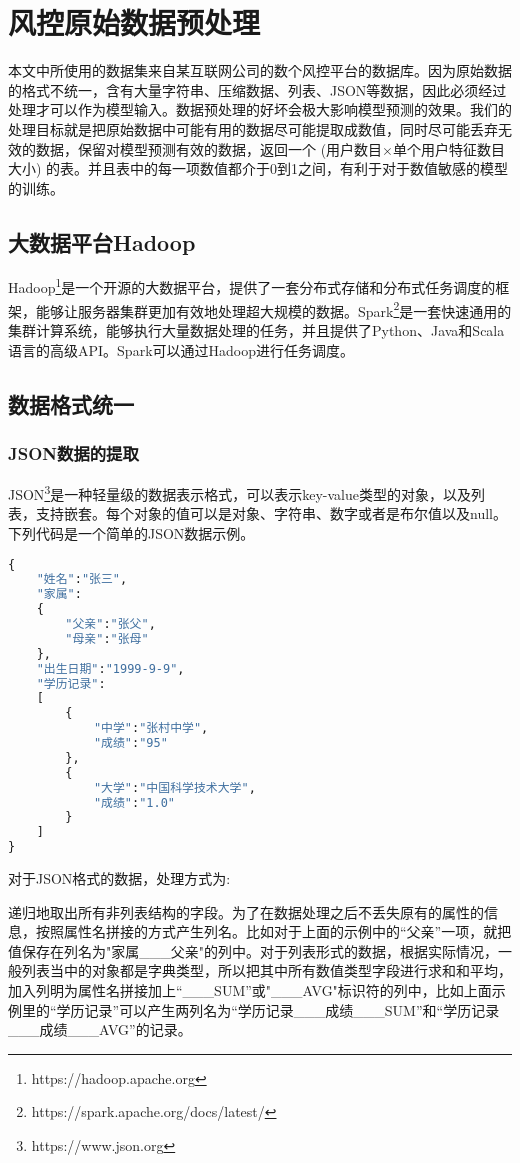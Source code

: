 \chapter{风控原始数据预处理}
本文中所使用的数据集来自某互联网公司的数个风控平台的数据库。因为原始数据的格式不统一，含有大量字符串、压缩数据、列表、JSON等数据，因此必须经过处理才可以作为模型输入。数据预处理的好坏会极大影响模型预测的效果\cite{kotsiantis2006data}。我们的处理目标就是把原始数据中可能有用的数据尽可能提取成数值，同时尽可能丢弃无效的数据，保留对模型预测有效的数据，返回一个 (用户数目$\times$单个用户特征数目大小) 的表。并且表中的每一项数值都介于0到1之间，有利于对于数值敏感的模型的训练。
\section{大数据平台Hadoop}
Hadoop\footnote{https://hadoop.apache.org}是一个开源的大数据平台，提供了一套分布式存储和分布式任务调度的框架，能够让服务器集群更加有效地处理超大规模的数据。Spark\footnote{https://spark.apache.org/docs/latest/}是一套快速通用的集群计算系统，能够执行大量数据处理的任务，并且提供了Python、Java和Scala语言的高级API。Spark可以通过Hadoop进行任务调度。
\section{数据格式统一}
\subsection{JSON数据的提取}
JSON\footnote{https://www.json.org}是一种轻量级的数据表示格式，可以表示key-value类型的对象，以及列表，支持嵌套。每个对象的值可以是对象、字符串、数字或者是布尔值以及null。下列代码是一个简单的JSON数据示例。
\begin{lstlisting}[language=PYTHON, caption={JSON示例}, label={JSON示例}]
{
	"姓名":"张三",
	"家属": 
	{
		"父亲":"张父",
		"母亲":"张母"
	},
	"出生日期":"1999-9-9",
	"学历记录":
	[
		{
			"中学":"张村中学",
			"成绩":"95"
		},
		{
			"大学":"中国科学技术大学",
			"成绩":"1.0"
		}
	]
}
\end{lstlisting}

对于JSON格式的数据，处理方式为:

递归地取出所有非列表结构的字段。为了在数据处理之后不丢失原有的属性的信息，按照属性名拼接的方式产生列名。比如对于上面的示例中的“父亲”一项，就把值保存在列名为"家属\_\_\_父亲"的列中。对于列表形式的数据，根据实际情况，一般列表当中的对象都是字典类型，所以把其中所有数值类型字段进行求和和平均，加入列明为属性名拼接加上“\_\_\_SUM”或"\_\_\_AVG"标识符的列中，比如上面示例里的“学历记录”可以产生两列名为“学历记录\_\_\_成绩\_\_\_SUM”和“学历记录\_\_\_成绩\_\_\_AVG”的记录。

